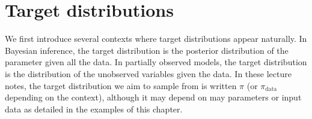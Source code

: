\documentclass[english,graybox,envcountchap,envcountsame,sectrefs,shortlabels]{svmono}
\theoremstyle{style}
\begin{document}



\section{Target distributions}
We first introduce several contexts where target distributions appear naturally. In Bayesian inference, the target distribution is the posterior distribution of the parameter given all the data. In partially observed models, the target distribution is the distribution of the unobserved variables given the data. In these lecture notes, the target distribution we aim to sample from is written $\pi$ (or $\pi_{\mathrm{data}}$ depending on the context), although it may depend on may parameters or input data as detailed in the examples of this chapter.
\end{document}
